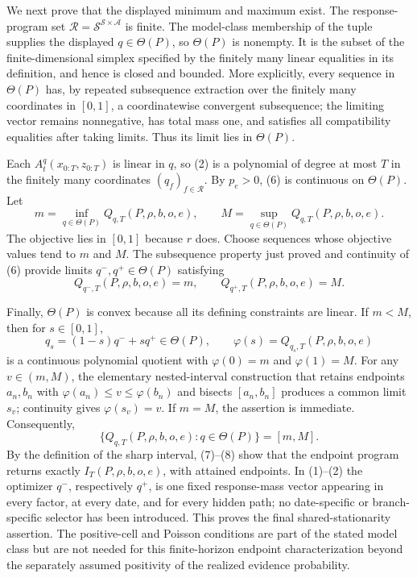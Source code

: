 We next prove that the displayed minimum and maximum exist.  The response-program set \(\mathcal R=\mathcal S^{\mathcal S\times\mathcal A}\) is finite.  The model-class membership of the tuple supplies the displayed \(q\in\Theta(P)\), so \(\Theta(P)\) is nonempty.  It is the subset of the finite-dimensional simplex specified by the finitely many linear equalities in its definition, and hence is closed and bounded.  More explicitly, every sequence in \(\Theta(P)\) has, by repeated subsequence extraction over the finitely many coordinates in \([0,1]\), a coordinatewise convergent subsequence; the limiting vector remains nonnegative, has total mass one, and satisfies all compatibility equalities after taking limits.  Thus its limit lies in \(\Theta(P)\).

Each \(A_t^q(x_{0:T},z_{0:T})\) is linear in \(q\), so (2) is a polynomial of degree at most \(T\) in the finitely many coordinates \((q_f)_{f\in\mathcal R}\).  By \(p_e>0\), (6) is continuous on \(\Theta(P)\).  Let
\[
 m=\inf_{q\in\Theta(P)}Q_{q,T}(P,\rho,b,o,e),\qquad
 M=\sup_{q\in\Theta(P)}Q_{q,T}(P,\rho,b,o,e).
\]
The objective lies in \([0,1]\) because \(r\) does.  Choose sequences whose objective values tend to \(m\) and \(M\).  The subsequence property just proved and continuity of (6) provide limits \(q^-,q^+\in\Theta(P)\) satisfying
\[
 Q_{q^-,T}(P,\rho,b,o,e)=m,
 \qquad
 Q_{q^+,T}(P,\rho,b,o,e)=M.                                                \tag{7}
\]

Finally, \(\Theta(P)\) is convex because all its defining constraints are linear.  If \(m<M\), then for \(s\in[0,1]\),
\[
 q_s=(1-s)q^-+s q^+\in\Theta(P),
 \qquad
 \varphi(s)=Q_{q_s,T}(P,\rho,b,o,e)
\]
is a continuous polynomial quotient with \(\varphi(0)=m\) and \(\varphi(1)=M\).  For any \(v\in(m,M)\), the elementary nested-interval construction that retains endpoints \(a_n,b_n\) with \(\varphi(a_n)\leq v\leq\varphi(b_n)\) and bisects \([a_n,b_n]\) produces a common limit \(s_v\); continuity gives \(\varphi(s_v)=v\).  If \(m=M\), the assertion is immediate.  Consequently,
\[
 \{Q_{q,T}(P,\rho,b,o,e):q\in\Theta(P)\}=[m,M].                            \tag{8}
\]
By the definition of the sharp interval, (7)--(8) show that the endpoint program returns exactly \(I_T(P,\rho,b,o,e)\), with attained endpoints.  In (1)--(2) the optimizer \(q^-\), respectively \(q^+\), is one fixed response-mass vector appearing in every factor, at every date, and for every hidden path; no date-specific or branch-specific selector has been introduced.  This proves the final shared-stationarity assertion.  The positive-cell and Poisson conditions are part of the stated model class but are not needed for this finite-horizon endpoint characterization beyond the separately assumed positivity of the realized evidence probability.
